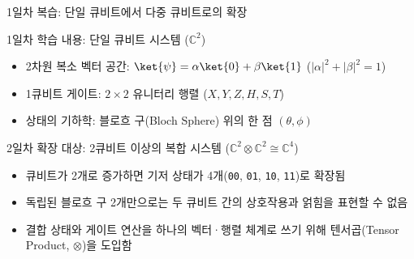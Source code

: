 \documentclass[aspectratio=169, 10pt]{beamer}
\begin{document}
\begin{frame}{1일차 복습: 단일 큐비트에서 다중 큐비트로의 확장}
    \begin{qcblock}{1일차 학습 내용: 단일 큐비트 시스템 ($\mathbb{C}^2$)}
        \begin{itemize}
            \item 2차원 복소 벡터 공간: $\ket{\psi} = \alpha\ket{0} + \beta\ket{1}$ ($|\alpha|^2 + |\beta|^2 = 1$)
            \pause
            \item 1큐비트 게이트: $2 \times 2$ 유니터리 행렬 ($X, Y, Z, H, S, T$)
            \pause
            \item 상태의 기하학: 블로흐 구(Bloch Sphere) 위의 한 점 $(\theta, \phi)$
        \end{itemize}
    \end{qcblock}
    \pause
    \vspace{0.2cm}
    \begin{qcalert}{2일차 확장 대상: 2큐비트 이상의 복합 시스템 ($\mathbb{C}^2 \otimes \mathbb{C}^2 \cong \mathbb{C}^4$)}
        \begin{itemize}
            \item 큐비트가 2개로 증가하면 기저 상태가 4개(\texttt{00}, \texttt{01}, \texttt{10}, \texttt{11})로 확장됨
            \pause
            \item 독립된 블로흐 구 2개만으로는 두 큐비트 간의 상호작용과 얽힘을 표현할 수 없음
            \pause
            \item 결합 상태와 게이트 연산을 하나의 벡터·행렬 체계로 쓰기 위해 텐서곱(Tensor Product, $\otimes$)을 도입함
        \end{itemize}
    \end{qcalert}
\end{frame}
\end{document}
